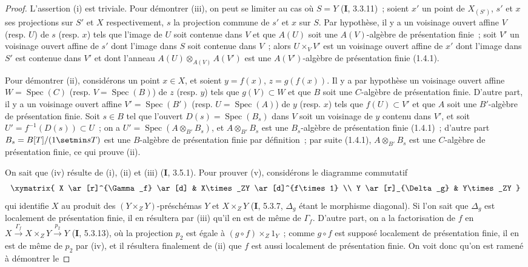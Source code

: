 \begin{proof}
L'assertion (i) est triviale. Pour démontrer (iii), on peut se limiter au cas
où $S=Y$ (\textbf{I}, 3.3.11)~; soient $x'$ un point de $X_{(S')}$, $s'$ et $x$ ses
projections sur $S'$ et $X$ respectivement, $s$ la projection commune de $s'$
et $x$ sur $S$. Par hypothèse, il y a un voisinage ouvert affine $V$ (resp.
$U$) de $s$ (resp. $x$) tels que l'image de $U$ soit contenue dans $V$ et que
$A(U)$ soit une $A(V)$-algèbre de présentation finie~; soit $V'$ un voisinage
ouvert affine de $s'$ dont l'image dans $S$ soit contenue dans $V$~; alors
$U\times_VV'$ est un voisinage ouvert affine de $x'$ dont l'image dans $S'$
est contenue dans $V'$ et dont l'anneau $A(U)\otimes_{A(V)}A(V')$ est une
$A(V')$-algèbre de présentation finie (1.4.1).

Pour démontrer (ii), considérons un point $x\in X$, et soient $y=f(x)$,
$z=g(f(x))$. Il y a par hypothèse un voisinage ouvert affine $W=\operatorname{Spec}(C)$
(resp. $V=\operatorname{Spec}(B)$) de $z$ (resp. $y$) tels que $g(V)\subset W$ et que $B$
soit une $C$-algèbre de présentation finie. D'autre part, il y a un voisinage
ouvert affine $V'=\operatorname{Spec}(B')$ (resp. $U=\operatorname{Spec}(A)$) de $y$ (resp. $x$) tels que
$f(U)\subset V'$ et que $A$ soit une $B'$-algèbre de présentation finie. Soit
$s\in B$ tel que l'ouvert $D(s)=\operatorname{Spec}(B_s)$ dans $V$ soit un voisinage de $y$
contenu dans $V'$, et soit $U'=f^{-1}(D(s))\subset U$~; on a
$U'=\operatorname{Spec}(A\otimes_{B'}B_s)$, et $A\otimes_{B'}B_s$ est une $B_s$-algèbre de
présentation finie (1.4.1)~; d'autre part $B_s=B[T]/(1\setmin sT)$ est une
$B$-algèbre de présentation finie par définition~; par suite (1.4.1),
$A\otimes_{B'}B_s$ est une $C$-algèbre de présentation finie, ce qui prouve
(ii).

On sait que (iv) résulte de (i), (ii) et (iii) (\textbf{I}, 3.5.1). Pour prouver (v),
considérons le diagramme commutatif
\[
\xymatrix{
X \ar[r]^{\Gamma_f} \ar[d] & X\times_ZY \ar[d]^{f\times 1} \\
Y \ar[r]_{\Delta_g} & Y\times_ZY
}
\]
qui identifie $X$ au produit des $(Y\times_ZY)$-préschémas $Y$ et
$X\times_ZY$ (\textbf{I}, 5.3.7, $\Delta_g$ étant le morphisme diagonal). Si l'on sait
que $\Delta_g$ est localement de présentation finie, il en résultera par
(iii) qu'il en est de même de $\Gamma_f$. D'autre part, on a la factorisation
de $f$ en
$X\xrightarrow{\Gamma_f}X\times_ZY\xrightarrow{p_2}Y$ (\textbf{I}, 5.3.13), où la
projection $p_2$ est égale à $(g\circ f)\times_Z1_Y$~; comme $g\circ f$ est
supposé localement de présentation finie, il en est de même de $p_2$ par
(iv), et il résultera finalement de (ii) que $f$ est aussi localement de
présentation finie. On voit donc qu'on est ramené à démontrer le
\end{proof}

